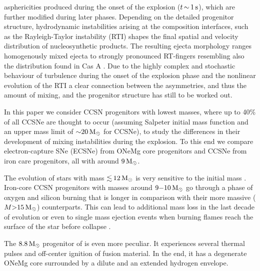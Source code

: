 \documentclass[fleqn,usenatbib]{mnras}
\newcommand{\solm}{\ensuremath{\rm{M_{\odot}}}\xspace}
\begin{document}
asphericities produced during the onset of the explosion ($t\,\mathord{\sim}\, 1\, \rm s$), which are further modified during later phases. Depending on the detailed progenitor structure, hydrodynamic instabilities arising at the composition interfaces, such as the Rayleigh-Taylor instability (RTI) shapes the final spatial and velocity distribution of nucleosynthetic products. The resulting ejecta morphology ranges homogenously mixed ejecta to strongly pronounced RT-fingers resembling also the  distribution found in Cas A \citep{Wongwathanarat2017,Grefenstette2017}. Due to the highly complex and stochastic behaviour of turbulence during the onset of the explosion phase and the nonlinear evolution of the RTI a clear connection between the asymmetries, and thus the amount of mixing, and the progenitor structure has still to be worked out.

In this paper we consider CCSN progenitors with lowest masses, where up to 40\% of all CCSNe are thought to occur (assuming Salpeter initial mass function  \citep{Salpeter1955} and an upper mass limit of $\mathord{\sim}20\,\solm$ for CCSNe), to study the differences in their development of mixing instabilities during the explosion. To this end we compare electron-capture SNe (ECSNe) from ONeMg core progenitors and CCSNe from iron care progenitors, all with around $9\,\solm$. 

The evolution of stars with mass $\mathord{\lesssim}\,12\, \solm$ is very sensitive to the initial mass \citep{Woosley2015}.
Iron-core CCSN progenitors with masses around $9\mathord{-}10\,\solm$ go through a phase of oxygen and silicon burning that is longer in comparison with their more massive ($M \mathord{>} 15\, \solm$) counterparts. This can lead to additional mass loss in the last decade of evolution or even to single mass ejection events when burning flames reach the surface of the star before collapse \citet{Woosley2015}.

The $8.8\, \solm$ progenitor of \cite{Nomoto1984} is even more peculiar. It experiences  several thermal pulses and off-center ignition of fusion material. In the end, it has a degenerate ONeMg core surrounded by a dilute and an extended hydrogen envelope.
 
\end{document}
